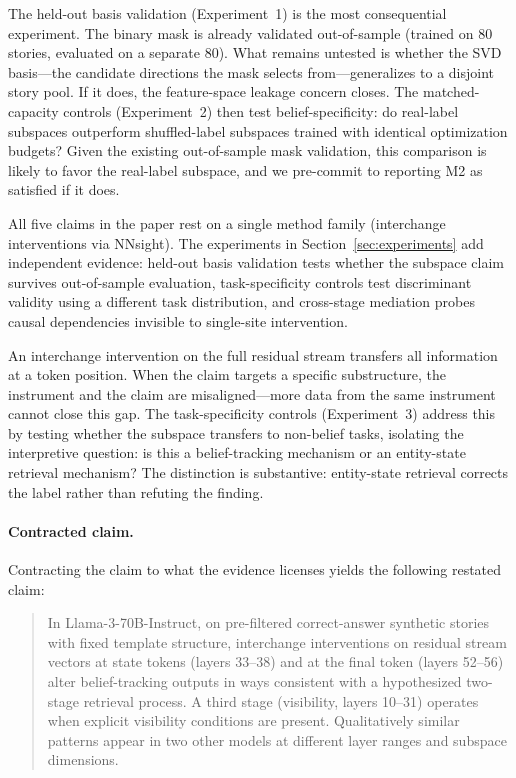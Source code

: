 \documentclass[11pt]{article}
\begin{document}
The held-out basis validation (Experiment~1) is the most consequential experiment. The binary mask is already validated out-of-sample (trained on 80 stories, evaluated on a separate 80). What remains untested is whether the SVD basis---the candidate directions the mask selects from---generalizes to a disjoint story pool. If it does, the feature-space leakage concern closes. The matched-capacity controls (Experiment~2) then test belief-specificity: do real-label subspaces outperform shuffled-label subspaces trained with identical optimization budgets? Given the existing out-of-sample mask validation, this comparison is likely to favor the real-label subspace, and we pre-commit to reporting M2 as satisfied if it does.

All five claims in the paper rest on a single method family (interchange interventions via NNsight). The experiments in Section~\ref{sec:experiments} add independent evidence: held-out basis validation tests whether the subspace claim survives out-of-sample evaluation, task-specificity controls test discriminant validity using a different task distribution, and cross-stage mediation probes causal dependencies invisible to single-site intervention.

An interchange intervention on the full residual stream transfers all information at a token position. When the claim targets a specific substructure, the instrument and the claim are misaligned---more data from the same instrument cannot close this gap. The task-specificity controls (Experiment~3) address this by testing whether the subspace transfers to non-belief tasks, isolating the interpretive question: is this a belief-tracking mechanism or an entity-state retrieval mechanism? The distinction is substantive: entity-state retrieval corrects the label rather than refuting the finding.

\paragraph{Contracted claim.}
Contracting the claim to what the evidence licenses yields the following restated claim:

\begin{quote}
In Llama-3-70B-Instruct, on pre-filtered correct-answer synthetic stories with fixed template structure, interchange interventions on residual stream vectors at state tokens (layers 33--38) and at the final token (layers 52--56) alter belief-tracking outputs in ways consistent with a hypothesized two-stage retrieval process. A third stage (visibility, layers 10--31) operates when explicit visibility conditions are present. Qualitatively similar patterns appear in two other models at different layer ranges and subspace dimensions.
\end{quote}
\end{document}
